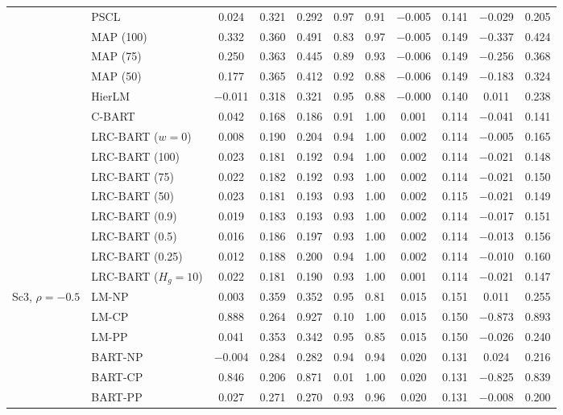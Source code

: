 \documentclass[11pt]{article}
\theoremstyle{definition}
\theoremstyle{plain}
\begin{document}
\begin{center}
\begin{longtable}{llccccccccc}
& PSCL & 0.024 & 0.321 & 0.292 & 0.97 & 0.91 & $-$0.005 & 0.141 & $-$0.029 & 0.205 \\
& MAP (100) & 0.332 & 0.360 & 0.491 & 0.83 & 0.97 & $-$0.005 & 0.149 & $-$0.337 & 0.424 \\
& MAP (75) & 0.250 & 0.363 & 0.445 & 0.89 & 0.93 & $-$0.006 & 0.149 & $-$0.256 & 0.368 \\
& MAP (50) & 0.177 & 0.365 & 0.412 & 0.92 & 0.88 & $-$0.006 & 0.149 & $-$0.183 & 0.324 \\
& HierLM & $-$0.011 & 0.318 & 0.321 & 0.95 & 0.88 & $-$0.000 & 0.140 & 0.011 & 0.238 \\
& C-BART & 0.042 & 0.168 & 0.186 & 0.91 & 1.00 & 0.001 & 0.114 & $-$0.041 & 0.141 \\
& LRC-BART ($w=0$) & 0.008 & 0.190 & 0.204 & 0.94 & 1.00 & 0.002 & 0.114 & $-$0.005 & 0.165 \\
& LRC-BART (100) & 0.023 & 0.181 & 0.192 & 0.94 & 1.00 & 0.002 & 0.114 & $-$0.021 & 0.148 \\
& LRC-BART (75) & 0.022 & 0.182 & 0.192 & 0.93 & 1.00 & 0.002 & 0.114 & $-$0.021 & 0.150 \\
& LRC-BART (50) & 0.023 & 0.181 & 0.193 & 0.93 & 1.00 & 0.002 & 0.115 & $-$0.021 & 0.149 \\
& LRC-BART (0.9) & 0.019 & 0.183 & 0.193 & 0.93 & 1.00 & 0.002 & 0.114 & $-$0.017 & 0.151 \\
& LRC-BART (0.5) & 0.016 & 0.186 & 0.197 & 0.93 & 1.00 & 0.002 & 0.114 & $-$0.013 & 0.156 \\
& LRC-BART (0.25) & 0.012 & 0.188 & 0.200 & 0.94 & 1.00 & 0.002 & 0.114 & $-$0.010 & 0.160 \\
& LRC-BART ($H_g=10$) & 0.022 & 0.181 & 0.190 & 0.93 & 1.00 & 0.001 & 0.114 & $-$0.021 & 0.147 \\
\midrule
\multirow{20}{*}{Sc3, $\rho=-0.5$} & LM-NP & 0.003 & 0.359 & 0.352 & 0.95 & 0.81 & 0.015 & 0.151 & 0.011 & 0.255 \\
& LM-CP & 0.888 & 0.264 & 0.927 & 0.10 & 1.00 & 0.015 & 0.150 & $-$0.873 & 0.893 \\
& LM-PP & 0.041 & 0.353 & 0.342 & 0.95 & 0.85 & 0.015 & 0.150 & $-$0.026 & 0.240 \\
& BART-NP & $-$0.004 & 0.284 & 0.282 & 0.94 & 0.94 & 0.020 & 0.131 & 0.024 & 0.216 \\
& BART-CP & 0.846 & 0.206 & 0.871 & 0.01 & 1.00 & 0.020 & 0.131 & $-$0.825 & 0.839 \\
& BART-PP & 0.027 & 0.271 & 0.270 & 0.93 & 0.96 & 0.020 & 0.131 & $-$0.008 & 0.200 \\

\end{longtable}
\end{center}
\end{document}
